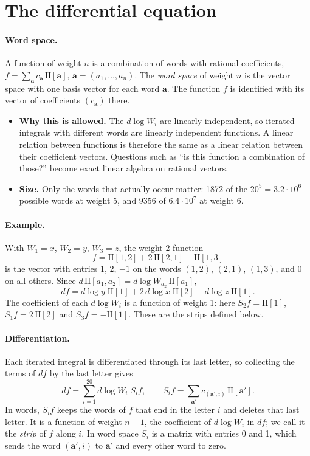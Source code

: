 \documentclass[11pt]{article}
\newcommand{\II}{\mathrm{II}}
\begin{document}
\section{The differential equation}
\paragraph{Word space.} A function of weight $n$ is a combination of words with rational coefficients,
$f=\sum_{\mathbf a}c_{\mathbf a}\,\II[\mathbf a]$, $\mathbf a=(a_1,\dots,a_n)$. The \emph{word space} of weight $n$ is the
vector space with one basis vector for each word $\mathbf a$. The function $f$ is identified with its vector of
coefficients $(c_{\mathbf a})$ there.
\begin{itemize}
\item \textbf{Why this is allowed.} The $d\log W_i$ are linearly independent, so iterated integrals with different
  words are linearly independent functions. A linear relation between functions is therefore the same as a linear
  relation between their coefficient vectors. Questions such as ``is this function a combination of those?'' become
  exact linear algebra on rational vectors.
\item \textbf{Size.} Only the words that actually occur matter: 1872 of the $20^5=3.2\cdot10^6$ possible words at
  weight 5, and 9356 of $6.4\cdot10^7$ at weight 6.
\end{itemize}

\paragraph{Example.} With $W_1=x$, $W_2=y$, $W_3=z$, the weight-2 function
\[
  f=\II[1,2]+2\,\II[2,1]-\II[1,3]
\]
is the vector with entries $1$, $2$, $-1$ on the words $(1,2)$, $(2,1)$, $(1,3)$, and 0 on all others. Since
$d\,\II[a_1,a_2]=d\log W_{a_2}\,\II[a_1]$,
\[
  df=d\log y\;\II[1]+2\,d\log x\;\II[2]-d\log z\;\II[1] .
\]
The coefficient of each $d\log W_i$ is a function of weight 1: here $S_2f=\II[1]$, $S_1f=2\,\II[2]$ and
$S_3f=-\II[1]$. These are the strips defined below.

\paragraph{Differentiation.} Each iterated integral is differentiated through its last letter, so collecting the terms
of $df$ by the last letter gives
\[
  df=\sum_{i=1}^{20}d\log W_i\;S_if,\qquad S_if=\sum_{\mathbf a'}c_{(\mathbf a',i)}\,\II[\mathbf a'] .
\]
In words, $S_if$ keeps the words of $f$ that end in the letter $i$ and deletes that last letter. It is a function of
weight $n-1$, the coefficient of $d\log W_i$ in $df$; we call it the \emph{strip} of $f$ along $i$. In word space $S_i$
is a matrix with entries 0 and 1, which sends the word $(\mathbf a',i)$ to $\mathbf a'$ and every other word to zero.
\end{document}
